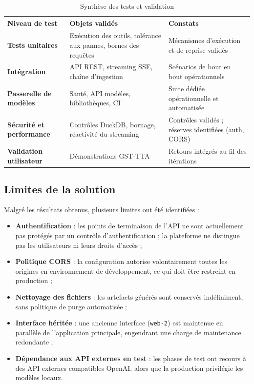 \begin{table}[H]
\centering
\caption{Synthèse des tests et validation}
\label{tab:synthese-tests}
\small
\begin{tabularx}{\textwidth}{>{\bfseries}p{4cm}Y>{\raggedright\arraybackslash}p{4.4cm}}
\toprule
{}
\color{white}Niveau de test & \color{white}Objets validés & \color{white}Constats \\
\midrule
Tests unitaires & Exécution des outils, tolérance aux pannes, bornes des requêtes & Mécanismes d'exécution et de reprise validés \\
\midrule
Intégration & API REST, streaming SSE, chaîne d'ingestion & Scénarios de bout en bout opérationnels \\
\midrule
Passerelle de modèles & Santé, API modèles, bibliothèques, CI & Suite dédiée opérationnelle et automatisée \\
\midrule
Sécurité et performance & Contrôles DuckDB, bornage, réactivité du streaming & Contrôles validés ; réserves identifiées (auth, CORS) \\
\midrule
Validation utilisateur & Démonstrations GST-TTA & Retours intégrés au fil des itérations \\
\bottomrule
\end{tabularx}
\end{table}

\subsection{Limites de la solution}

Malgré les résultats obtenus, plusieurs limites ont été identifiées :

\begin{itemize}
  \item \textbf{Authentification} : les points de terminaison de l'API ne sont actuellement pas protégés par un contrôle d'authentification ; la plateforme ne distingue pas les utilisateurs ni leurs droits d'accès ;
  \item \textbf{Politique CORS} : la configuration autorise volontairement toutes les origines en environnement de développement, ce qui doit être restreint en production ;
  \item \textbf{Nettoyage des fichiers} : les artefacts générés sont conservés indéfiniment, sans politique de purge automatisée ;
  \item \textbf{Interface héritée} : une ancienne interface (\texttt{web-2}) est maintenue en parallèle de l'application principale, engendrant une charge de maintenance redondante ;
  \item \textbf{Dépendance aux API externes en test} : les phases de test ont recours à des API externes compatibles OpenAI, alors que la production privilégie les modèles locaux.
\end{itemize}

